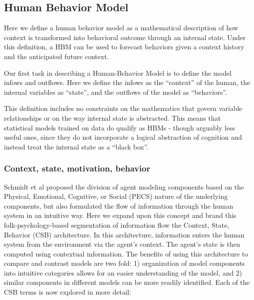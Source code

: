 \documentclass[runningheads,a4paper]{llncs}
\begin{document}
\subsection{Human Behavior Model}
Here we define a human behavior model as a mathematical description of how context is transformed into behavioral outcome through an internal state.
Under this definition, a HBM can be used to forecast behaviors given a context history and the anticipated future context.

Our first task in describing a Human-Behavior Model is to define the model infows and outflows.
Here we define the infows as the “context” of the human, the internal variables as “state”, and the outflows of the model as “behaviors”.

This definition includes no constraints on the mathematics that govern variable relationships or on the way internal state is abstracted.
This means that statistical models trained on data do qualify as HBMs - though arguably less useful ones, since they do not incorporate a logical abstraction of cognition and instead treat the internal state as a “black box”.

\subsubsection{Context, state, motivation, behavior}
Schmidt et al proposed the division of agent modeling components based on the Physical, Emotional, Cognitive, or Social (PECS) nature of the underlying components, but also formulated the flow of information through the human system in an intuitive way. Here we expand upon this concept and brand this folk-psychology-based segmentation of information flow the Context, State, Behavior (CSB) architecture. In this architecture, information enters the human system from the environment via the agent’s context. The agent’s state is then computed using contextual information. The benefits of using this architecture to compare and contrast models are two fold: 1) organization of model components into intuitive categories allows for an easier understanding of the model, and 2) similar components in different models can be more readily identified. Each of the CSB terms is now explored in more detail:
\end{document}
